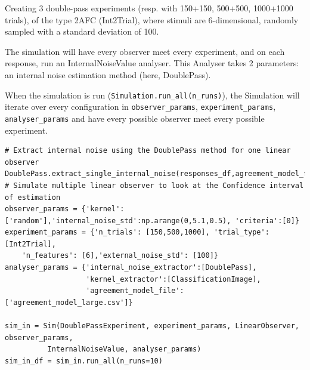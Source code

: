 \begin{tcolorbox}[title=Palin Toolbox: Internal Noise estimation,
    colback=white!30!white, colframe=blue!80!white]
Creating 3 double-pass experiments (resp. with 150+150, 500+500, 1000+1000 trials), of the type 2AFC (Int2Trial), where stimuli are 6-dimensional, randomly sampled with a standard deviation of 100.

The simulation will have every observer meet every experiment, and on each response, run an InternalNoiseValue analyser. This Analyser takes 2 parameters: an internal noise estimation method (here, DoublePass).  

When the simulation is run (\texttt{Simulation.run\_all(n\_runs)}), the Simulation will iterate over every configuration in \texttt{observer\_params}, \texttt{experiment\_params}, \texttt{analyser\_params} and have every possible observer meet every possible experiment.

\tcblower

\begin{verbatim}
# Extract internal noise using the DoublePass method for one linear observer
DoublePass.extract_single_internal_noise(responses_df,agreement_model_file='agreement_model_large.csv')
# Simulate multiple linear observer to look at the Confidence interval of estimation
observer_params = {'kernel':['random'],'internal_noise_std':np.arange(0,5.1,0.5), 'criteria':[0]}
experiment_params = {'n_trials': [150,500,1000], 'trial_type': [Int2Trial], 
    'n_features': [6],'external_noise_std': [100]}
analyser_params = {'internal_noise_extractor':[DoublePass],
                   'kernel_extractor':[ClassificationImage],
                   'agreement_model_file':['agreement_model_large.csv']}         
                   
sim_in = Sim(DoublePassExperiment, experiment_params, LinearObserver, observer_params, 
          InternalNoiseValue, analyser_params)
sim_in_df = sim_in.run_all(n_runs=10)
\end{verbatim}

\end{tcolorbox}

